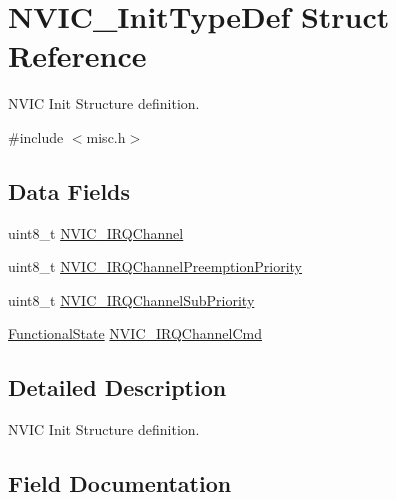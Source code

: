 \hypertarget{struct_n_v_i_c___init_type_def}{}\section{N\+V\+I\+C\+\_\+\+Init\+Type\+Def Struct Reference}
\label{struct_n_v_i_c___init_type_def}


N\+V\+IC Init Structure definition.  




{\ttfamily \#include $<$misc.\+h$>$}

\subsection*{Data Fields}
\begin{DoxyCompactItemize}
\item 
uint8\+\_\+t \mbox{\hyperlink{struct_n_v_i_c___init_type_def_ae972a759b8b04f3856a614315c03d2d0}{N\+V\+I\+C\+\_\+\+I\+R\+Q\+Channel}}
\item 
uint8\+\_\+t \mbox{\hyperlink{struct_n_v_i_c___init_type_def_aa395d7151e569272cbcf04420a1a4128}{N\+V\+I\+C\+\_\+\+I\+R\+Q\+Channel\+Preemption\+Priority}}
\item 
uint8\+\_\+t \mbox{\hyperlink{struct_n_v_i_c___init_type_def_a91b24559ddbc12752f2414582fb47cb9}{N\+V\+I\+C\+\_\+\+I\+R\+Q\+Channel\+Sub\+Priority}}
\item 
\mbox{\hyperlink{group___exported__types_gac9a7e9a35d2513ec15c3b537aaa4fba1}{Functional\+State}} \mbox{\hyperlink{struct_n_v_i_c___init_type_def_a3c5567ef024a0489884083c88f17b4d5}{N\+V\+I\+C\+\_\+\+I\+R\+Q\+Channel\+Cmd}}
\end{DoxyCompactItemize}


\subsection{Detailed Description}
N\+V\+IC Init Structure definition. 



\subsection{Field Documentation}
\mbox{\label{struct_n_v_i_c___init_type_def_ae972a759b8b04f3856a614315c03d2d0}} 
